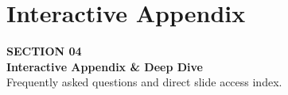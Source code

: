 \documentclass[aspectratio=169, 10pt]{beamer}
\begin{document}
\section{Interactive Appendix}
\label{sec:appendix}

\begin{frame}
  \vfill
  \begin{tcolorbox}[
    enhanced,
    colback=NavyDark,
    colframe=RoyalAccent,
    boxrule=2pt,
    arc=6pt,
    top=14pt, bottom=14pt, left=14pt
  ]
    {\large\color{SkyAccent}\bfseries SECTION 04}\\[4pt]
    {\huge\bfseries\color{white} Interactive Appendix \& Deep Dive}\\[6pt]
    {\small\color{PageBg!80!white} Frequently asked questions and direct slide access index.}
  \end{tcolorbox}
  \vfill
\end{frame}

\end{document}
